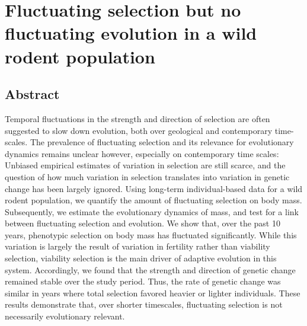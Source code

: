 

\chapter[\texorpdfstring{Chapter 5 \\ Fluctuating selection but no fluctuating evolution in a wild rodent population}{Chapter 5 -- Fluctuating selection but no fluctuating evolution in a wild rodent population}]{Fluctuating selection but no fluctuating evolution in a wild rodent population}
\label{chap:flusel}

\section{Abstract}
Temporal fluctuations in the strength and direction of selection are often suggested to slow down evolution, both over geological and contemporary time-scales. The prevalence of fluctuating selection and its relevance for evolutionary dynamics remains unclear however, especially on contemporary time scales: Unbiased empirical estimates of variation in selection are still scarce, and the question of how much variation in selection translates into variation in genetic change has been largely ignored.
Using long-term individual-based data for a wild rodent population, we quantify the amount of fluctuating selection on body mass. Subsequently, we estimate the evolutionary dynamics of mass, and test for a link between fluctuating selection and evolution. 
We show that, over the past 10 years, phenotypic selection on body mass has fluctuated significantly. While this variation is largely the result of variation in fertility rather than viability selection, viability selection is the main driver of adaptive evolution in this system. Accordingly, we found that the strength and direction of genetic change remained stable over the study period. Thus, the rate of genetic change was similar in years where total selection favored heavier or lighter individuals.
These results demonstrate that, over shorter timescales, fluctuating selection is not necessarily evolutionary relevant. 

